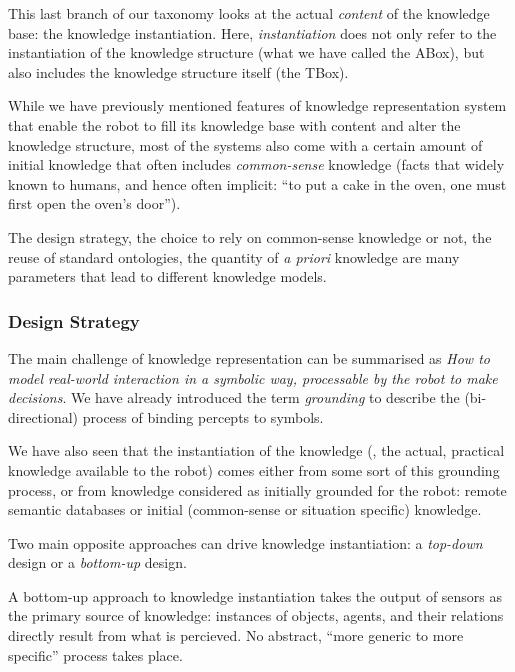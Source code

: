 This last branch of our taxonomy looks at the actual \emph{content} of the
knowledge base: the knowledge instantiation. Here, \emph{instantiation} does
not only refer to the instantiation of the knowledge structure (what we have
called the ABox), but also includes the knowledge structure itself (the TBox).

While we have previously mentioned features of knowledge representation system
that enable the robot to fill its knowledge base with content and alter the
knowledge structure, most of the systems also come with a certain amount of
initial knowledge that often includes \emph{common-sense} knowledge (\ie facts
that widely known to humans, and hence often implicit: ``to put a cake in the
oven, one must first open the oven's door'').

The design strategy, the choice to rely on common-sense knowledge or not, the
reuse of standard ontologies, the quantity of {\it a priori} knowledge are many
parameters that lead to different knowledge models.


\subsubsection{Design Strategy}
\label{sect|design-strategies}

The main challenge of knowledge representation can be summarised as \emph{How to
model real-world interaction in a symbolic way, processable by the robot to
make decisions}. We have already introduced the term \emph{grounding} to
describe the (bi-directional) process of binding percepts to symbols.

We have also seen that the instantiation of the knowledge (\ie, the actual,
practical knowledge available to the robot) comes either from some sort of this
grounding process, or from knowledge considered as initially grounded for the
robot: remote semantic databases or initial (common-sense or situation
specific) knowledge.

Two main opposite approaches can drive knowledge instantiation: a
\emph{top-down} design or a \emph{bottom-up} design.

A bottom-up approach to knowledge instantiation takes the output of sensors as
the primary source of knowledge: instances of objects, agents, and their
relations directly result from what is percieved. No abstract, ``more generic
to more specific'' process takes place.

